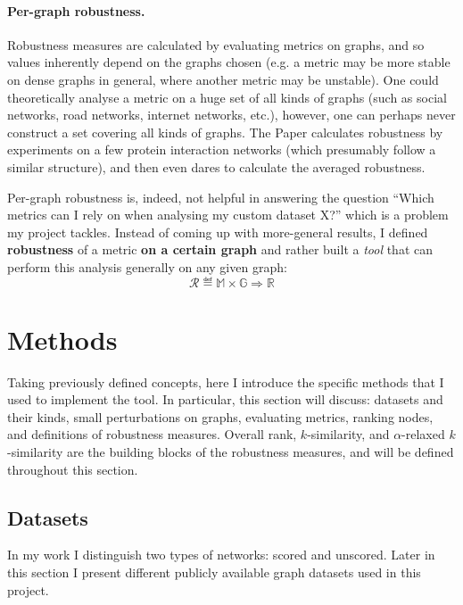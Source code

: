 \paragraph*{Per-graph robustness.} Robustness measures are calculated by evaluating metrics on graphs, and so values inherently depend on the graphs chosen (e.g. a metric may be more stable on dense graphs in general, where another metric may be unstable).
One could theoretically analyse a metric on a huge set of all kinds of graphs (such as social networks, road networks, internet networks, etc.), however, one can perhaps never construct a set covering all kinds of graphs.
The Paper calculates robustness by experiments on a few protein interaction networks (which presumably follow a similar structure), and then even dares to calculate the averaged robustness.

Per-graph robustness is, indeed, not helpful in answering the question ``Which metrics can I rely on when analysing my custom dataset X?'' which is a problem my project tackles.
Instead of coming up with more-general results, I defined \textbf{robustness} of a metric \textbf{on a certain graph} and rather built a \textsl{tool} that can perform this analysis generally on any given graph:
\begin{equation}
    \mathcal{R} \eqdef \mathbb{M} \times \mathbb{G} \Rightarrow \mathbb{R}
\end{equation}


\section{Methods}\label{sec:methods}

Taking previously defined concepts, here I introduce the specific methods that I used to implement the \graffs tool.
In particular, this section will discuss: datasets and their kinds, small perturbations on graphs, evaluating metrics, ranking nodes, and definitions of robustness measures.
Overall rank, $k$-similarity, and $\alpha$-relaxed $k$-similarity are the building blocks of the robustness measures, and will be defined throughout this section.

\subsection{Datasets}\label{sec:datasets}

In my work I distinguish two types of networks: scored and unscored.
Later in this section I present different publicly available graph datasets used in this project.

